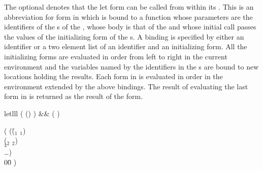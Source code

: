 \begin{optDefinition}
%
\Syntax
{}%
%
\remarks%
The optional \/ denotes that the let form can be called from
within its .  This is an abbreviation for  form in
which  is bound to a function whose parameters are the
identifiers of the s of the , whose body is that of
the  and whose initial call passes the values of the initializing
form of the s.  A binding is specified by either an identifier or
a two element list of an identifier and an initializing form.  All the
initializing forms are evaluated in order from left to right in the current
environment and the variables named by the identifiers in the s
are bound to new locations holding the results.  Each form in  is
evaluated in order in the environment extended by the above bindings.  The
result of evaluating the last form in  is returned as the result of
the  form.
%
\rewriterules
%
\begin{RewriteTable}{let}{lll}
    ( () ) &\rewrite& ( ) \\
\begin{minipage}[t]{\columnwidth}
\begin{tabbing}
    ( (\=($_1$ $_1$) \\
    \>($_2$ $_2$) \\
    \>$_3$ \\
    \>\ldots)\\
    00\= \kill
    \>)
\end{tabbing}
\end{minipage}

\end{RewriteTable}
\end{optDefinition}
